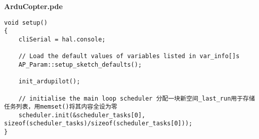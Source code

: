 \documentclass[a4paper,10pt]{ctexart} %
\begin{document}
\begin{center}
\textbf{ArduCopter.pde}
\end{center}


\begin{lstlisting}
void setup() 
{
    cliSerial = hal.console;

    // Load the default values of variables listed in var_info[]s
    AP_Param::setup_sketch_defaults();

    init_ardupilot();

    // initialise the main loop scheduler 分配一块新空间_last_run用于存储任务列表，用memset()将其内容全设为零
    scheduler.init(&scheduler_tasks[0], sizeof(scheduler_tasks)/sizeof(scheduler_tasks[0]));
}
\end{lstlisting}
\end{document}
